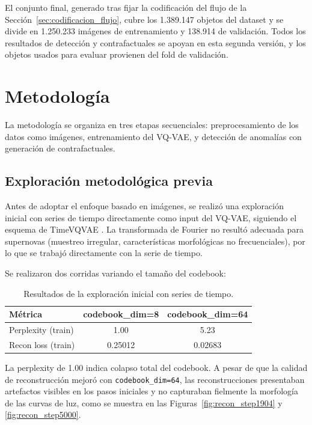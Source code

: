 El conjunto final, generado tras fijar la codificación del flujo de la Sección~\ref{sec:codificacion_flujo}, cubre los 1.389.147 objetos del dataset y se divide en 1.250.233 imágenes de entrenamiento y 138.914 de validación. Todos los resultados de detección y contrafactuales se apoyan en esta segunda versión, y los objetos usados para evaluar provienen del fold de validación.
\chapter{Metodología}

La metodología se organiza en tres etapas secuenciales: preprocesamiento de los datos como imágenes, entrenamiento del VQ-VAE, y detección de anomalías con generación de contrafactuales.

\section{Exploración metodológica previa}

Antes de adoptar el enfoque basado en imágenes, se realizó una exploración inicial con series de tiempo directamente como input del VQ-VAE, siguiendo el esquema de TimeVQVAE \cite{lee2023timevqvae}. La transformada de Fourier no resultó adecuada para supernovas (muestreo irregular, características morfológicas no frecuenciales), por lo que se trabajó directamente con la serie de tiempo.

Se realizaron dos corridas variando el tamaño del codebook:

\begin{table}[H]
\centering
\begin{tabular}{|l|c|c|}
\hline
\textbf{Métrica} & \textbf{codebook\_dim=8} & \textbf{codebook\_dim=64} \\
\hline
Perplexity (train) & 1.00 & 5.23 \\
Recon loss (train) & 0.25012 & 0.02683 \\
\hline
\end{tabular}
\caption{Resultados de la exploración inicial con series de tiempo.}
\label{tab:exploracion_previa}
\end{table}

La perplexity de 1.00 indica colapso total del codebook. A pesar de que la calidad de reconstrucción mejoró con \texttt{codebook\_dim=64}, las reconstrucciones presentaban artefactos visibles en los pasos iniciales y no capturaban fielmente la morfología de las curvas de luz, como se muestra en las Figuras~\ref{fig:recon_step1904} y \ref{fig:recon_step5000}.

